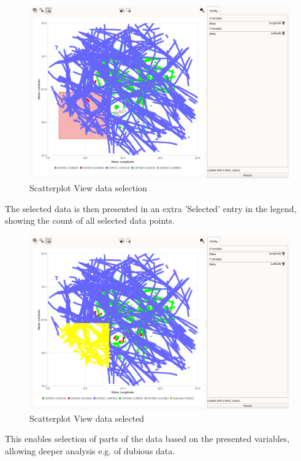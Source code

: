 \begin{figure}[H]
    \hspace*{-2cm}
    \includegraphics[width=18cm,frame]{figures/scatter_select.png}
  \caption{Scatterplot View data selection}
\end{figure}

The selected data is then presented in an extra 'Selected' entry in the legend, showing the count of all selected data points.

\begin{figure}[H]
    \hspace*{-2cm}
    \includegraphics[width=18cm,frame]{figures/scatter_selected.png}
  \caption{Scatterplot View data selected}
\end{figure}

This enables selection of parts of the data based on the presented variables, allowing deeper analysis e.g. of dubious data. \\

